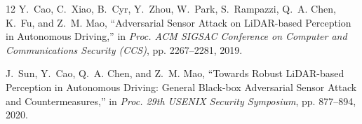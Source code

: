 \documentclass[12pt,a4paper]{article}
\begin{document}
\begin{thebibliography}{12}
Y.~Cao, C.~Xiao, B.~Cyr, Y.~Zhou, W.~Park, S.~Rampazzi, Q.~A. Chen, K.~Fu,
and Z.~M. Mao, ``Adversarial Sensor Attack on LiDAR-based Perception in
Autonomous Driving,'' in \emph{Proc. ACM SIGSAC Conference on Computer and
Communications Security (CCS)}, pp. 2267--2281, 2019.

J.~Sun, Y.~Cao, Q.~A. Chen, and Z.~M. Mao, ``Towards Robust LiDAR-based
Perception in Autonomous Driving: General Black-box Adversarial Sensor Attack
and Countermeasures,'' in \emph{Proc. 29th USENIX Security Symposium},
pp. 877--894, 2020.

\end{thebibliography}
\clearpage
\end{document}
